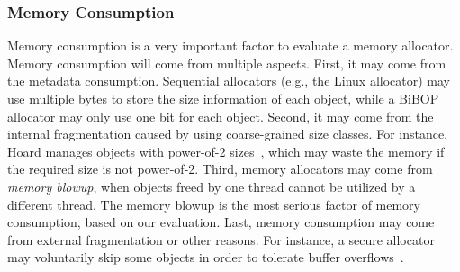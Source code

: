 \subsubsection{Memory Consumption}
\label{sec:memoryconsumption}

Memory consumption is a very important factor to evaluate a memory allocator. Memory consumption will come from multiple aspects. First, it may come from the metadata consumption. Sequential allocators (e.g., the Linux allocator) may use multiple bytes to store the size information of each object, while a BiBOP allocator may only use one bit for each object. Second, it may come from the internal fragmentation caused by using coarse-grained size classes. For instance, Hoard manages objects with power-of-2 sizes~\cite{Hoard}, which may waste the memory if the required size is not power-of-2. Third, memory allocators may come from \textit{memory blowup}, when objects freed by one thread cannot be utilized by a different thread. The memory blowup is the most serious factor of memory consumption, based on our evaluation. Last, memory consumption may come from external fragmentation or other reasons. For instance, a secure allocator may voluntarily skip some objects in order to tolerate buffer overflows~\cite{DieHard}. 



